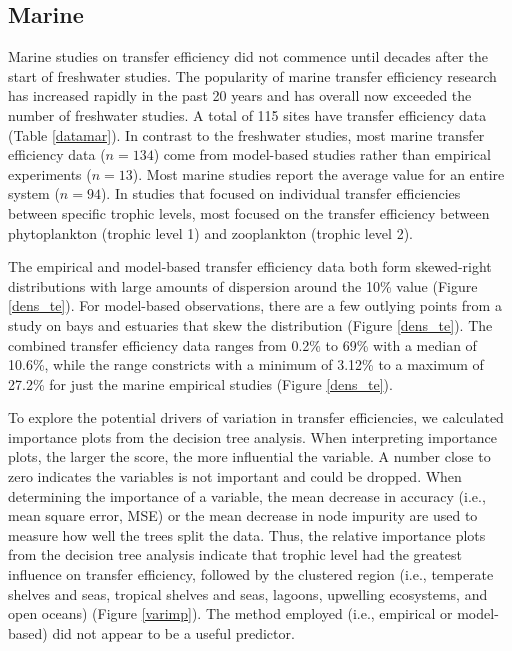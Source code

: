 \documentclass[oneside,12pt,final]{sty/ucthesis-CA2012}
\begin{document}
\begin{mainmatter}
\subsection*{Marine}
Marine studies on transfer efficiency did not commence until decades after the start of freshwater studies. The popularity of marine transfer efficiency research has increased rapidly in the past 20 years and has overall now exceeded the number of freshwater studies. A total of 115 sites have transfer efficiency data (Table \ref{datamar}). In contrast to the freshwater studies, most marine transfer efficiency data ($n=134$) come from model-based studies rather than empirical experiments ($n=13$). Most marine studies report the average value for an entire system ($n=94$). In studies that focused on individual transfer efficiencies between specific trophic levels, most focused on the transfer efficiency between phytoplankton (trophic level 1) and zooplankton (trophic level 2).

\vspace{5mm}

The empirical and model-based transfer efficiency data both form skewed-right distributions with large amounts of dispersion around the 10\% value (Figure \ref{dens_te}). For model-based observations, there are a few outlying points from a study on bays and estuaries that skew the distribution (Figure \ref{dens_te}). The combined transfer efficiency data ranges from 0.2\% to 69\% with a median of 10.6\%, while the range constricts with a minimum of 3.12\% to a maximum of 27.2\% for just the marine empirical studies (Figure \ref{dens_te}). 

\vspace{5mm}

To explore the potential drivers of variation in transfer efficiencies, we calculated importance plots from the decision tree analysis. When interpreting importance plots, the larger the score, the more influential the variable. A number close to zero indicates the variables is not important and could be dropped. When determining the importance of a variable, the mean decrease in accuracy (i.e., mean square error, MSE) or the mean decrease in node impurity are used to measure how well the trees split the data. Thus, the relative importance plots from the decision tree analysis indicate that trophic level had the greatest influence on transfer efficiency, followed by the clustered region (i.e., temperate shelves and seas, tropical shelves and seas, lagoons, upwelling ecosystems, and open oceans) (Figure \ref{varimp}). The method employed (i.e., empirical or model-based) did not appear to be a useful predictor.  


\end{mainmatter}
\end{document}
